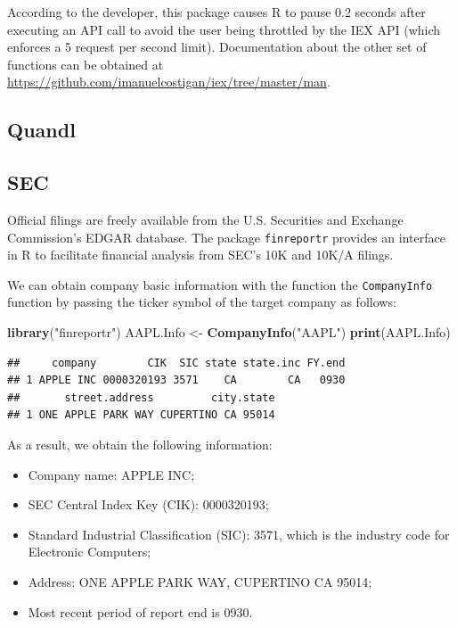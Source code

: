 \documentclass[]{book}
\newenvironment{Shaded}{\begin{snugshade}}{\end{snugshade}}
\newcommand{\KeywordTok}[1]{\textcolor[rgb]{0.13,0.29,0.53}{\textbf{#1}}}
\newcommand{\StringTok}[1]{\textcolor[rgb]{0.31,0.60,0.02}{#1}}
\newcommand{\NormalTok}[1]{#1}
\providecommand{\tightlist}{%
  \setlength{\itemsep}{0pt}\setlength{\parskip}{0pt}}
\theoremstyle{definition}
\theoremstyle{definition}
\theoremstyle{definition}
\theoremstyle{remark}
\begin{document}
According to the developer, this package causes R to pause 0.2 seconds
after executing an API call to avoid the user being throttled by the IEX
API (which enforces a 5 request per second limit). Documentation about
the other set of functions can be obtained at
\url{https://github.com/imanuelcostigan/iex/tree/master/man}.

\subsection{Quandl}\label{quandl}

\subsection{SEC}\label{sec}

Official filings are freely available from the U.S. Securities and
Exchange Commission's EDGAR database. The package \texttt{finreportr}
provides an interface in R to facilitate financial analysis from SEC's
10K and 10K/A filings.

We can obtain company basic information with the function the
\texttt{CompanyInfo} function by passing the ticker symbol of the target
company as follows:

\begin{Shaded}
\begin{Highlighting}[]
\KeywordTok{library}\NormalTok{(}\StringTok{"finreportr"}\NormalTok{)}
\NormalTok{AAPL.Info <-}\StringTok{ }\KeywordTok{CompanyInfo}\NormalTok{(}\StringTok{"AAPL"}\NormalTok{)}
\KeywordTok{print}\NormalTok{(AAPL.Info)}
\end{Highlighting}
\end{Shaded}

\begin{verbatim}
##     company        CIK  SIC state state.inc FY.end
## 1 APPLE INC 0000320193 3571    CA        CA   0930
##       street.address         city.state
## 1 ONE APPLE PARK WAY CUPERTINO CA 95014
\end{verbatim}

As a result, we obtain the following information:

\begin{itemize}
\tightlist
\item
  Company name: APPLE INC;
\item
  SEC Central Index Key (CIK): 0000320193;\\
\item
  Standard Industrial Classification (SIC): 3571, which is the industry
  code for Electronic Computers;
\item
  Address: ONE APPLE PARK WAY, CUPERTINO CA 95014;
\item
  Most recent period of report end is 0930.
\end{itemize}
\end{document}
